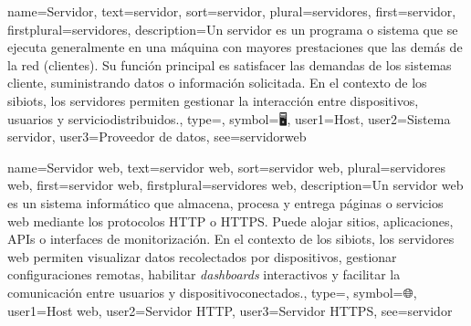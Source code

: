 	
	{
		name={Servidor},
		text={servidor},
		sort={servidor},
		plural={servidores},
		first={servidor},
		firstplural={servidores},
		description={Un servidor es un programa o sistema que se ejecuta generalmente en una m{\'a}quina con mayores prestaciones que las dem{\'a}s de la red (clientes). Su funci{\'o}n principal es satisfacer las demandas de los sistemas cliente, suministrando datos o informaci{\'o}n solicitada. En el contexto de los \glspl{sibiot}, los servidores permiten gestionar la interacci{\'o}n entre \glspl{dispositivo}, \glspl{usuario} y \glspl{serviciodistribuido}.},
		type=\glsdefaulttype,
		symbol={🖥},
		user1={Host},
		user2={Sistema servidor},
		user3={Proveedor de datos},
		see={servidorweb}
	}
	
	{
		name={Servidor web},
		text={servidor web},
		sort={servidor web},
		plural={servidores web},
		first={servidor web},
		firstplural={servidores web},
		description={Un servidor web es un sistema inform{\'a}tico que almacena, procesa y entrega p{\'a}ginas o servicios web mediante los protocolos HTTP o HTTPS. Puede alojar sitios, aplicaciones, APIs o interfaces de monitorizaci{\'o}n. En el contexto de los \glspl{sibiot}, los servidores web permiten visualizar datos recolectados por \glspl{dispositivo}, gestionar configuraciones remotas, habilitar \textit{dashboards} interactivos y facilitar la comunicaci{\'o}n entre usuarios y \glspl{dispositivoconectado}.},
		type=\glsdefaulttype,
		symbol={🌐},
		user1={Host web},
		user2={Servidor HTTP},
		user3={Servidor HTTPS},
		see={servidor}
	}
	
